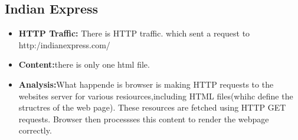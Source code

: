 \documentclass{article}
\begin{document}
\subsection{Indian Express}
\begin{itemize}
    \item \textbf{HTTP Traffic:} There is HTTP traffic. which sent a request to http:/indianexpress.com/
    \item\textbf{Content:}there is only one html file.
    \item\textbf{Analysis:}What happende is browser is making HTTP requests to the websites server for various resiources,including HTML files(whihc define the structres of the web page). These resources are fetched using HTTP GET requests. Browser then processses this content to render the webpage correctly.
\end{itemize}
\end{document}
